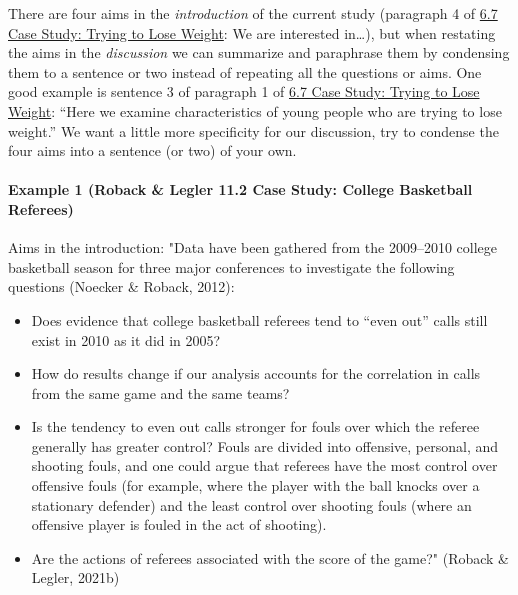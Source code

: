 \documentclass[
  openany]{book}
\begin{document}
There are four aims in the \emph{introduction} of the current study (paragraph 4 of \href{https://bookdown.org/roback/bookdown-BeyondMLR/ch-logreg.html\#case-study-trying-to-lose-weight}{6.7 Case Study: Trying to Lose Weight}: We are interested in\ldots), but when restating the aims in the \emph{discussion} we can summarize and paraphrase them by condensing them to a sentence or two instead of repeating all the questions or aims. One good example is sentence 3 of paragraph 1 of \href{https://bookdown.org/roback/bookdown-BeyondMLR/ch-logreg.html\#case-study-trying-to-lose-weight}{6.7 Case Study: Trying to Lose Weight}: ``Here we examine characteristics of young people who are trying to lose weight.'' We want a little more specificity for our discussion, try to condense the four aims into a sentence (or two) of your own.

\hypertarget{example-1-roback-legler-11.2-case-study-college-basketball-referees}{%
\paragraph{Example 1 (Roback \& Legler 11.2 Case Study: College Basketball Referees)}\label{example-1-roback-legler-11.2-case-study-college-basketball-referees}}

Aims in the introduction: "Data have been gathered from the 2009--2010 college basketball season for three major conferences to investigate the following questions (Noecker \& Roback, 2012):

\begin{itemize}
\item
  Does evidence that college basketball referees tend to ``even out'' calls still exist in 2010 as it did in 2005?
\item
  How do results change if our analysis accounts for the correlation in calls from the same game and the same teams?
\item
  Is the tendency to even out calls stronger for fouls over which the referee generally has greater control? Fouls are divided into offensive, personal, and shooting fouls, and one could argue that referees have the most control over offensive fouls (for example, where the player with the ball knocks over a stationary defender) and the least control over shooting fouls (where an offensive player is fouled in the act of shooting).
\item
  Are the actions of referees associated with the score of the game?" (Roback \& Legler, 2021b)
\end{itemize}
\end{document}
